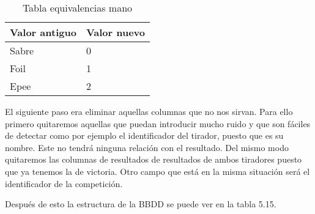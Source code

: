 \begin{table}[]
  \centering
  \caption{Tabla equivalencias mano}
  \label{tab:Tabla equivalencias mano}
  \begin{tabular}{|ll|}
    \hline
    \rowcolor[HTML]{C0C0C0}
    Valor antiguo & Valor nuevo \\ \hline
    Sabre & 0 \\ \hline
    Foil & 1 \\ \hline
    Epee & 2 \\ \hline
  \end{tabular}
\end{table}

El siguiente paso era eliminar aquellas columnas que no nos sirvan. Para ello
primero quitaremos aquellas que puedan introducir mucho ruido y que son fáciles
de detectar como por ejemplo el identificador del tirador, puesto que es su nombre.
Este no tendrá ninguna relación con el resultado. Del mismo modo quitaremos las columnas
de resultados de resultados de ambos tiradores puesto que ya tenemos la de victoria.
Otro campo que está en la misma situación será el identificador de la competición.

Después de esto la estructura de la BBDD se puede ver en la tabla 5.15.

